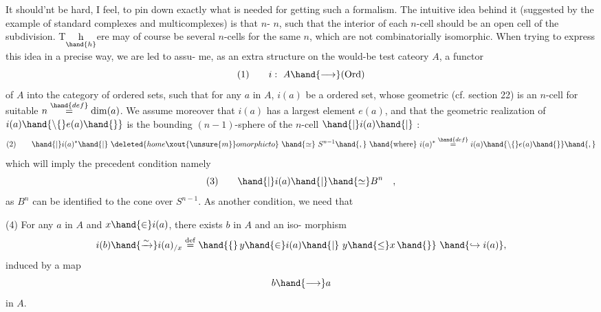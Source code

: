 
It should'nt be hard,  I feel,  to pin down exactly what is needed for
getting such a formalism.  The intuitive idea behind it (suggested by
the example of  standard complexes and multicomplexes)  is that
\hand{\uline{\textcolor{black}{such a formalism should be associated to cellular decompositions of}}}
$n$-\hand{\uline{\textcolor{black}{cells}}} \hand{\uline{\textcolor{black}{for variable}}} $n$,  such that the interior of each $n$-cell should
be an open cell of the subdivision.  T\(\underset{\hand{h}}{\text{h}}\)ere may of course be several
$n$-cells for the same $n$,  which are not combinatorially isomorphic.
When trying to express this idea in a precise way,  we are led to assu-%
me,  as an extra structure on the would-be test cateory $A$,  a functor
\[ (1) \qquad i:\ A \hand{\longrightarrow} (\mathrm{Ord}) \]
of $A$ into the category of ordered sets,  such that for any $a$ in $A$,
$i(a)$ be a \hand{\uline{\textcolor{black}{finite}}} ordered set,  whose geometric   (cf. section
22)  is an $n$-cell for suitable  $n \overset{\hand{def}}{=} \mathrm{dim}(a)$.  We assume moreover that
$i(a)$ has a largest element  $e(a)$,  and that the geometric realization
of  $i(a) \hand{\setminus\{} e(a) \hand{\}}$ is the bounding  $(n-1)$-sphere of the $n$-cell  $\hand{|} i(a) \hand{|}$ :
\[ (2) \qquad \hand{|} i(a)^{*} \hand{|}\ \deleted{home\xout{\unsure{m}}omorphic to}\ \hand{\simeq}\ S^{n-1} \hand{,}\ \hand{\text{where}}\ i(a)^{*} \overset{\hand{def}}{=} i(a) \hand{\setminus\{}e(a)\hand{\}} \hand{,} \]
which will imply the precedent condition namely
\[ (3) \qquad \hand{|} i(a) \hand{|} \hand{\simeq} B^{n} \quad , \]
as $B^{n}$ can be identified to the cone over $S^{n-1}$.  As another condition,
we need that 

(4) \quad For any $a$ in $A$ and  $x \hand{\in} i(a)$,  there exists $b$ in $A$ and an iso-%
morphism
\[ i(b) \hand{\xrightarrow{\sim}} i(a)_{/x} \overset{\mathrm{def}}{=} \hand{\{}\, y \hand{\in} i(a) \hand{|}\ y \hand{\leq} x \,\hand{\}} \ \hand{\hookrightarrow i(a)}, \]
induced by a map
\[ b \hand{\longrightarrow} a \]
in $A$.

